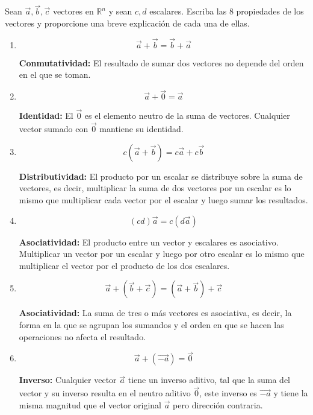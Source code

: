 \documentclass[12pt]{article}
\begin{document}
\section{}

Sean $\vec{a} , \vec{b} , \vec{c}$ vectores en $\mathbb{R}^n$ y sean $c,d$ escalares. Escriba las 8 propiedades de los vectores y proporcione una breve explicación de cada una de ellas.

\begin{enumerate}

\item $$\vec{a}+\vec{b} = \vec{b}+\vec{a}$$
  
  \textbf{Conmutatividad:} El resultado de sumar dos vectores no depende del orden en el que se toman.

\item $$\vec{a}+\vec{0} = \vec{a}$$
  
  \textbf{Identidad:} El $\vec{0}$ es el elemento neutro de la suma de vectores. Cualquier vector sumado con $\vec{0}$ mantiene su identidad. 

\item $$c(\vec{a}+\vec{b}) = c\vec{a}+c\vec{b}$$
  
   \textbf{Distributividad:} El producto por un escalar se distribuye sobre la suma de vectores, es decir,  multiplicar la suma de dos vectores por un escalar es lo mismo que multiplicar cada vector por el escalar y luego sumar los resultados.

 \item $$(cd)\vec{a} = c(d\vec{a})$$
   
   \textbf{Asociatividad:} El producto entre un vector y escalares es asociativo. Multiplicar un vector por un escalar y luego por otro escalar es lo mismo que multiplicar el vector por el producto de los dos escalares.  

 \item $$\vec{a}+(\vec{b}+\vec{c}) = (\vec{a}+\vec{b})+\vec{c}$$
   
   \textbf{Asociatividad:} La suma de tres o más vectores es asociativa, es decir, la forma en la que se agrupan los sumandos  y el orden en que se hacen las operaciones no afecta el resultado.

 \item $$\vec{a}+(\vec{-a}) = \vec{0}$$
   
   \textbf{Inverso:} Cualquier vector $\vec{a}$ tiene un inverso aditivo, tal que la suma del vector y su inverso resulta en el neutro aditivo $\vec{0}$, este inverso es $\vec{-a}$ y tiene la misma magnitud que el vector original $\vec{a}$ pero dirección contraria.
   

\end{enumerate}
\end{document}
